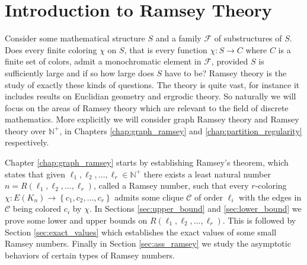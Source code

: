 \chapter{Introduction to Ramsey Theory}
Consider some mathematical structure $S$ and a family $\mathcal{F}$ of substructures of $S$. Does every finite coloring $\chi$ on $S$, that is every function $\chi: S \to C$ where $C$ is a finite set of colors, admit a monochromatic element in $\mathcal{F}$, provided $S$ is sufficiently large and if so how large does $S$ have to be? Ramsey theory is the study of exactly these kinds of questions. The theory is quite vast, for instance it includes results on Euclidian geometry and ergrodic theory. So naturally we will focus on the areas of Ramsey theory which are relevant to the field of discrete mathematics. More explicitly we will consider graph Ramsey theory and Ramsey theory over $\mathbb{N}^{+}$, in Chapters \ref{chap:graph_ramsey} and \ref{chap:partition_regularity} respectively.

Chapter \ref{chap:graph_ramsey} starts by establishing Ramsey's theorem, which states that given $\ell_1, \ell_2, \ldots, \ell_{r} \in \mathbb{N}^+$ there exists a least natural number $n = R(\ell_1, \ell_2, \ldots, \ell_{r})$, called a Ramsey number, such that every $r$-coloring $\chi: E(K_n) \to \left\{c_1, c_2, \ldots, c_{r}\right\}$ admits some clique $\mathcal{C}$ of order $\ell_i$ with the edges in $\mathcal{C}$ being colored $c_i$ by $\chi$. In Sections \ref{sec:upper_bound} and \ref{sec:lower_bound} we prove some lower and upper bounds on $R(\ell_1, \ell_2, \ldots, \ell_{r})$. This is followed by Section \ref{sec:exact_values} which establishes the exact values of some small Ramsey numbers. Finally in Section \ref{sec:ass_ramsey} we study the asymptotic behaviors of certain types of Ramsey numbers.

